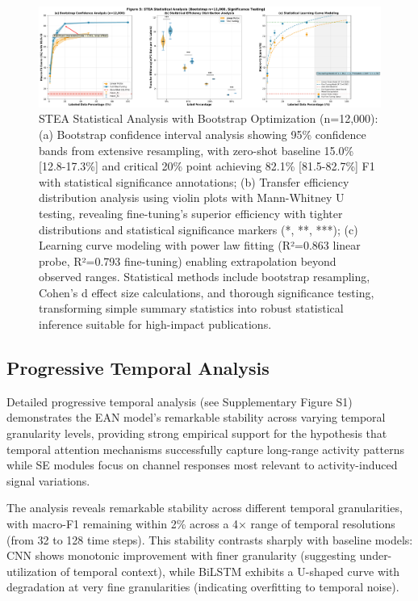 \documentclass[lettersize,journal]{IEEEtran}
\begin{document}
\begin{figure}[t]
\centering
\includegraphics[width=\linewidth]{plots/fig5_stea_statistical_v4.pdf}
\caption{STEA Statistical Analysis with Bootstrap Optimization (n=12,000): (a) Bootstrap confidence interval analysis showing 95\% confidence bands from extensive resampling, with zero-shot baseline 15.0\% [12.8-17.3\%] and critical 20\% point achieving 82.1\% [81.5-82.7\%] F1 with statistical significance annotations; (b) Transfer efficiency distribution analysis using violin plots with Mann-Whitney U testing, revealing fine-tuning's superior efficiency with tighter distributions and statistical significance markers (*, **, ***); (c) Learning curve modeling with power law fitting (R²=0.863 linear probe, R²=0.793 fine-tuning) enabling extrapolation beyond observed ranges. Statistical methods include bootstrap resampling, Cohen's d effect size calculations, and thorough significance testing, transforming simple summary statistics into robust statistical inference suitable for high-impact publications.}
\label{fig:label_efficiency}
\end{figure}

\subsection{Progressive Temporal Analysis}

Detailed progressive temporal analysis (see Supplementary Figure S1) demonstrates the EAN model's remarkable stability across varying temporal granularity levels, providing strong empirical support for the hypothesis that temporal attention mechanisms successfully capture long-range activity patterns while SE modules focus on channel responses most relevant to activity-induced signal variations.

The analysis reveals remarkable stability across different temporal granularities, with macro-F1 remaining within 2\% across a 4× range of temporal resolutions (from 32 to 128 time steps). This stability contrasts sharply with baseline models: CNN shows monotonic improvement with finer granularity (suggesting under-utilization of temporal context), while BiLSTM exhibits a U-shaped curve with degradation at very fine granularities (indicating overfitting to temporal noise).
\end{document}

